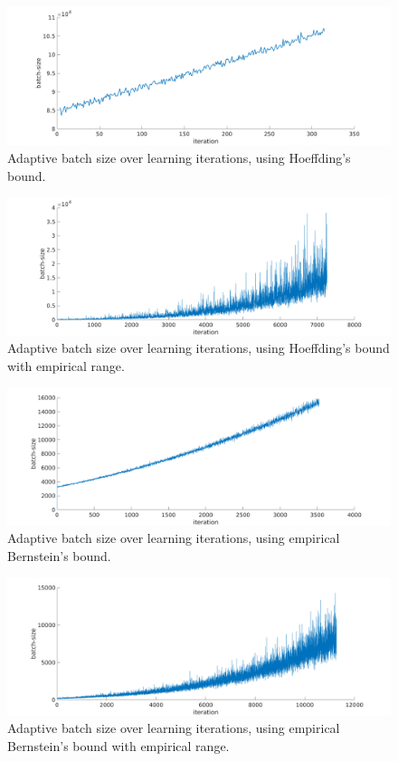 \begin{figure}[H]
\includegraphics[width = \textwidth]{Images/batchsize_hoeff.png}
\caption{Adaptive batch size over learning iterations, using Hoeffding's bound.}
\label{fig:4}
\end{figure}


\begin{figure}[H]
\includegraphics[width = \textwidth]{Images/batchsize_hoeff_emp.png}
\caption{Adaptive batch size over learning iterations, using Hoeffding's bound with empirical range.}
\label{fig:5}
\end{figure}


\begin{figure}[H]
\includegraphics[width = \textwidth]{Images/batchsize_bern.png}
\caption{Adaptive batch size over learning iterations, using empirical Bernstein's bound.}
\label{fig:6}
\end{figure}


\begin{figure}[H]
\includegraphics[width = \textwidth]{Images/batchsize_bern_emp.png}
\caption{Adaptive batch size over learning iterations, using empirical Bernstein's bound with empirical range.}
\label{fig:7}
\end{figure}

